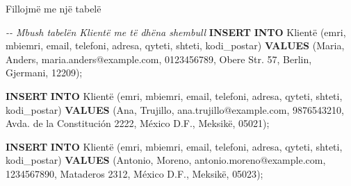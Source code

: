 \documentclass[
  ignorenonframetext,
]{beamer}
\newenvironment{Shaded}{\begin{snugshade}}{\end{snugshade}}
\newcommand{\CommentTok}[1]{\textcolor[rgb]{0.56,0.35,0.01}{\textit{#1}}}
\newcommand{\KeywordTok}[1]{\textcolor[rgb]{0.13,0.29,0.53}{\textbf{#1}}}
\newcommand{\NormalTok}[1]{#1}
\newcommand{\StringTok}[1]{\textcolor[rgb]{0.31,0.60,0.02}{#1}}
\begin{document}
\begin{frame}[fragile]{Fillojmë me një tabelë}
\label{fillojmuxeb-me-njuxeb-tabeluxeb-9}

\begin{Shaded}
\begin{Highlighting}[]
\CommentTok{{-}{-} Mbush tabelën Klientë me të dhëna shembull}
\KeywordTok{INSERT} \KeywordTok{INTO}\NormalTok{ Klientë (emri, mbiemri, email, telefoni, adresa, qyteti, shteti, kodi\_postar)}
\KeywordTok{VALUES}\NormalTok{ (}\StringTok{\textquotesingle{}Maria\textquotesingle{}}\NormalTok{, }\StringTok{\textquotesingle{}Anders\textquotesingle{}}\NormalTok{, }\StringTok{\textquotesingle{}maria.anders@example.com\textquotesingle{}}\NormalTok{, }\StringTok{\textquotesingle{}0123456789\textquotesingle{}}\NormalTok{, }\StringTok{\textquotesingle{}Obere Str. 57\textquotesingle{}}\NormalTok{, }\StringTok{\textquotesingle{}Berlin\textquotesingle{}}\NormalTok{, }\StringTok{\textquotesingle{}Gjermani\textquotesingle{}}\NormalTok{, }\StringTok{\textquotesingle{}12209\textquotesingle{}}\NormalTok{);}

\KeywordTok{INSERT} \KeywordTok{INTO}\NormalTok{ Klientë (emri, mbiemri, email, telefoni, adresa, qyteti, shteti, kodi\_postar)}
\KeywordTok{VALUES}\NormalTok{ (}\StringTok{\textquotesingle{}Ana\textquotesingle{}}\NormalTok{, }\StringTok{\textquotesingle{}Trujillo\textquotesingle{}}\NormalTok{, }\StringTok{\textquotesingle{}ana.trujillo@example.com\textquotesingle{}}\NormalTok{, }\StringTok{\textquotesingle{}9876543210\textquotesingle{}}\NormalTok{, }\StringTok{\textquotesingle{}Avda. de la Constitución 2222\textquotesingle{}}\NormalTok{, }\StringTok{\textquotesingle{}México D.F.\textquotesingle{}}\NormalTok{, }\StringTok{\textquotesingle{}Meksikë\textquotesingle{}}\NormalTok{, }\StringTok{\textquotesingle{}05021\textquotesingle{}}\NormalTok{);}

\KeywordTok{INSERT} \KeywordTok{INTO}\NormalTok{ Klientë (emri, mbiemri, email, telefoni, adresa, qyteti, shteti, kodi\_postar)}
\KeywordTok{VALUES}\NormalTok{ (}\StringTok{\textquotesingle{}Antonio\textquotesingle{}}\NormalTok{, }\StringTok{\textquotesingle{}Moreno\textquotesingle{}}\NormalTok{, }\StringTok{\textquotesingle{}antonio.moreno@example.com\textquotesingle{}}\NormalTok{, }\StringTok{\textquotesingle{}1234567890\textquotesingle{}}\NormalTok{, }\StringTok{\textquotesingle{}Mataderos 2312\textquotesingle{}}\NormalTok{, }\StringTok{\textquotesingle{}México D.F.\textquotesingle{}}\NormalTok{, }\StringTok{\textquotesingle{}Meksikë\textquotesingle{}}\NormalTok{, }\StringTok{\textquotesingle{}05023\textquotesingle{}}\NormalTok{);}


\end{Highlighting}
\end{Shaded}
\end{frame}
\end{document}

